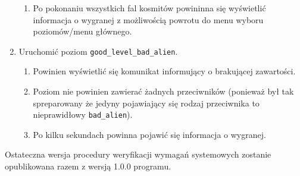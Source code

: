 \documentclass{article}
\begin{document}
\begin{enumerate}
\begin{enumerate}[label*=\arabic*]
					\item Po pokonaniu wszystkich fal kosmitów powininna się wyświetlić informacja o wygranej z możliwością powrotu do menu wyboru poziomów/menu głównego.
				\end{enumerate}
			\item Uruchomić poziom \verb|good_level_bad_alien|.
				\begin{enumerate}[label*=\arabic*]
					\item Powinien wyświetlić się komunikat informujący o brakującej zawartości.
					\item Poziom nie powinien zawierać żadnych przeciwników (ponieważ był tak spreparowany że jedyny pojawiający się rodzaj przeciwnika to nieprawidłowy \verb|bad_alien|).
					\item Po kilku sekundach powinna pojawić się informacja o wygranej.
				\end{enumerate}
		\end{enumerate}
	
		Ostateczna wersja procedury weryfikacji wymagań systemowych zostanie opublikowana razem z wersją 1.0.0 programu.
		
\end{document}
